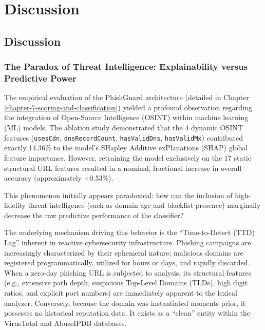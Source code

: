 \chapter{Discussion}
\label{chapter-11-discussion}

\section{Discussion}

\subsection{The Paradox of Threat Intelligence: Explainability versus
Predictive
Power}\label{the-paradox-of-threat-intelligence-explainability-versus-predictive-power}

The empirical evaluation of the PhishGuard architecture (detailed in
Chapter \ref{chapter-7-scoring-and-classification}) yielded a profound observation regarding the integration of
Open-Source Intelligence (OSINT) within machine learning (ML) models.
The ablation study demonstrated that the 4 dynamic OSINT features
(\texttt{usesCdn}, \texttt{dnsRecordCount}, \texttt{hasValidDns},
\texttt{hasValidMx}) contributed exactly 14.36\% to the model's SHapley
Additive exPlanations (SHAP) global feature importance. However,
retraining the model exclusively on the 17 static structural URL
features resulted in a nominal, fractional increase in overall accuracy
(approximately +0.53\%).

This phenomenon initially appears paradoxical: how can the inclusion of
high-fidelity threat intelligence (such as domain age and blacklist
presence) marginally decrease the raw predictive performance of the
classifier?

The underlying mechanism driving this behavior is the ``Time-to-Detect
(TTD) Lag'' inherent in reactive cybersecurity infrastructure. Phishing
campaigns are increasingly characterized by their ephemeral nature;
malicious domains are registered programmatically, utilized for hours or
days, and rapidly discarded. When a zero-day phishing URL is subjected
to analysis, its structural features (e.g., extensive path depth,
suspicious Top-Level Domains (TLDs), high digit ratios, and explicit
port numbers) are immediately apparent to the lexical analyzer.
Conversely, because the domain was instantiated moments prior, it
possesses no historical reputation data. It exists as a ``clean'' entity
within the VirusTotal and AbuseIPDB databases.

